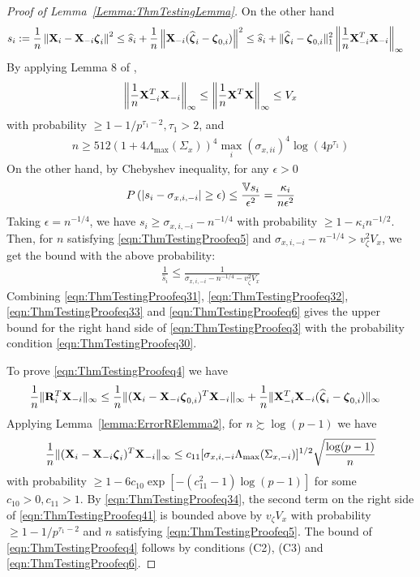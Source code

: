 \documentclass[12pt, letterpaper]{article}
\numberwithin{equation}{section}
\begin{document}
\begin{proof}[Proof of Lemma~\ref{Lemma:ThmTestingLemma}]
On the other hand
%
\begin{align*}
s_i := \frac{1}{n} \left\| {\mathbf{X}}_i - {\mathbf{X}}_{-i}  {\boldsymbol{\zeta}}_i \right\|^2 & \leq 
\widehat s_i + \frac{1}{n} \left\| {\mathbf{X}}_{-i} (\widehat {{\boldsymbol{\zeta}}}_i - {\boldsymbol{\zeta}}_{0,i} ) \right\|^2
\leq \widehat s_i + \| \widehat {{\boldsymbol{\zeta}}}_i - {\boldsymbol{\zeta}}_{0,i} \|_1^2 \left\| \frac{1}{n} {\mathbf{X}}_{-i}^T {\mathbf{X}}_{-i} \right\|_\infty
\end{align*}
%
By applying Lemma 8 of \cite{RavikumarEtal11},
%
\begin{align}\label{eqn:ThmTestingProofeq34}
\left\| \frac{1}{n} {\mathbf{X}}_{-i}^T {\mathbf{X}}_{-i} \right\|_\infty \leq
\left\| \frac{1}{n} {\mathbf{X}}^T {\mathbf{X}} \right\|_\infty \leq V_x
\end{align}
%
with probability $ \geq 1 - 1/p^{\tau_1-2}, \tau_1>2$, and
%
\begin{align}\label{eqn:ThmTestingProofeq5}
n \geq 512 ( 1 + 4 \Lambda_{\max} (\Sigma_{x}))^4 \max_i (\sigma_{x,ii} )^4 \log (4p^{\tau_1})
\end{align}
%
On the other hand, by Chebyshev inequality, for any $\epsilon>0$
%
$$
P\left( | s_i - \sigma_{x,i,-i}| \geq \epsilon \right) \leq \frac{{\mathbb{V}} s_i}{\epsilon^2} =
\frac{\kappa_i}{n \epsilon^2}
$$
%
Taking $\epsilon = n^{-1/4}$, we have $s_i \geq \sigma_{x,i,-i} - n^{-1/4}$ with probability $\geq 1 - \kappa_i n^{-1/2}$. Then, for $n$ satisfying \eqref{eqn:ThmTestingProofeq5} and $\sigma_{x,i,-i} - n^{-1/4} > v_\zeta^2 V_x$, we get the bound with the above probability:
%
\begin{align}\label{eqn:ThmTestingProofeq6}
\frac{1}{\widehat s_i} \leq \frac{1}{\sigma_{x,i,-i} - n^{-1/4} - v_\zeta^2 V_x}
\end{align}
%
Combining \eqref{eqn:ThmTestingProofeq31}, \eqref{eqn:ThmTestingProofeq32}, \eqref{eqn:ThmTestingProofeq33} and \eqref{eqn:ThmTestingProofeq6} gives the upper bound for the right hand side of \eqref{eqn:ThmTestingProofeq3} with the probability condition \eqref{eqn:ThmTestingProofeq30}.

To prove \eqref{eqn:ThmTestingProofeq4} we have
%
\begin{align}\label{eqn:ThmTestingProofeq41}
\frac{1}{n} \| {\mathbf{R}}_i^T {\mathbf{X}}_{-i} \|_\infty & \leq
\frac{1}{n} \| ({\mathbf{X}}_i - {\mathbf{X}}_{-i} {\boldsymbol{\zeta}}_{0,i})^T {\mathbf{X}}_{-i} \|_\infty +
\frac{1}{n} \| {\mathbf{X}}_{-i}^T {\mathbf{X}}_{-i} ( \widehat {{\boldsymbol{\zeta}}}_i - {\boldsymbol{\zeta}}_{0,i}) \|_\infty
\end{align}
%
Applying Lemma~\ref{lemma:ErrorRElemma2}, for $n \succsim \log(p-1)$ we have
%
%
\begin{align}
\frac{1}{n} \| ({\mathbf{X}}_i -  {\mathbf{X}}_{-i} {\boldsymbol{\zeta}}_i )^T {\mathbf{X}}_{-i} \|_\infty \leq 
c_{11} [ \sigma_{x,i,-i} \Lambda_{\max} (\Sigma_{x, -i}) ]^{1/2} \sqrt{\frac{ \log (p-1)}{n}}
\end{align}
%
with probability $\geq 1 - 6c_{10} \exp [-(c_{11}^2-1) \log (p-1)]$ for some $c_{10} >0, c_{11} > 1$. By \eqref{eqn:ThmTestingProofeq34}, the second term on the right side of \eqref{eqn:ThmTestingProofeq41} is bounded above by $v_\zeta V_x$ with probability $ \geq 1 - 1/p^{\tau_1-2}$ and $n$ satisfying \eqref{eqn:ThmTestingProofeq5}. The bound of \eqref{eqn:ThmTestingProofeq4} follows by conditions (C2), (C3) and \eqref{eqn:ThmTestingProofeq6}.
\end{proof}


%

\end{document}
